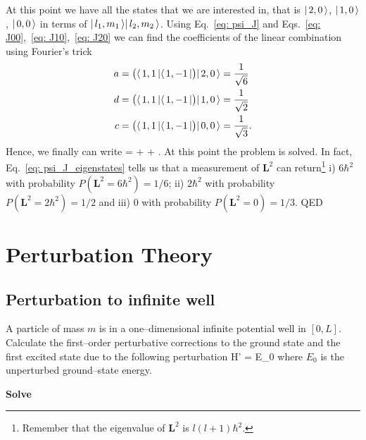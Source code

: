 \ee
At this point we have all the states that we are interested in, that is $| \, 2, 0 \, \rangle$, $| \, 1, 0 \, \rangle$, $| \, 0, 0 \, \rangle$ in terms of $| \, l_1, m_1 \, \rangle | \, l_2, m_2 \, \rangle$. Using Eq.~\eqref{eq: psi_J} and Eqs.~\eqref{eq: J00},~\eqref{eq: J10},~\eqref{eq: J20} we can find the coefficients of the linear combination using Fourier's trick
\begin{align}
    a & = \bigl( \langle \, 1, 1 \, | \langle \, 1, -1 \, |  \bigr) | \, 2, 0 \, \rangle = \frac{1}{\sqrt{6}} \\
    d & = \bigl( \langle \, 1, 1 \, | \langle \, 1, -1 \, |  \bigr) | \, 1, 0 \, \rangle = \frac{1}{\sqrt{2}} \\
    c & = \bigl( \langle \, 1, 1 \, | \langle \, 1, -1 \, |  \bigr) | \, 0, 0 \, \rangle = \frac{1}{\sqrt{3}}.
\end{align}
Hence, we finally can write
\be
    \label{eq: psi_J_eigenstates}
    \ke{\psi} =   +   +  .
\ee
At this point the problem is solved. In fact, Eq.~\eqref{eq: psi_J_eigenstates} tells us that a measurement of $\bm{L}^2$ can return\footnote{Remember that the eigenvalue of $\bm{L}^2$ is $l(l+1) \hbar^2$.} i) $6 \hbar^2$ with probability $P(\bm{L}^2 = 6 \hbar^2) = 1/6$; ii) $2 \hbar^2$ with probability $P(\bm{L}^2 = 2 \hbar^2) = 1/2$ and iii) $0$ with probability $P(\bm{L}^2 = 0) = 1/3$. QED
\section{Perturbation Theory}
\subsection{Perturbation to infinite well}
A particle of mass $m$ is in a one--dimensional infinite potential well in $[0, L]$. Calculate the first--order perturbative corrections to the ground state and the first excited state due to the following perturbation
\be
    \label{eq: perturbation}
    H' = \epsilon E_0 
\ee
where $E_0$ is the unperturbed ground--state energy.

\textbf{Solve}


